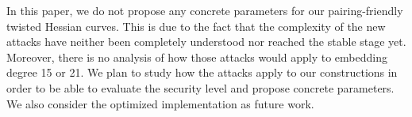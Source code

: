 %
%

In this paper, we do not propose any concrete parameters for our pairing-friendly twisted Hessian curves.
This is due to the fact that the complexity of the new attacks have neither been completely understood nor reached the stable stage yet.
Moreover, there is no analysis of how those attacks would apply to embedding degree 15 or 21.
We plan to study how the attacks apply to our constructions in order to be able to
evaluate the security level and propose concrete parameters.
We also consider the optimized implementation as future work.
